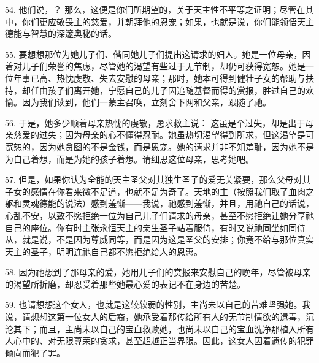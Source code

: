 \par

54. 他们说，？  那么，这便是你们所期望的，关于天主性不平等之证明；尽管在其中，你们更应敬畏主的慈爱，并朝拜他的恩宠；如果，也就是说，你们能领悟天主德能与智慧的深邃奥秘的话。\par

55. 要想想那位为她儿子们、偕同她儿子们提出这请求的妇人。她是一位母亲，因着对儿子们荣誉的焦虑，尽管她的渴望有些过于无节制，却仍可获得宽恕。她是一位年事已高、热忱虔敬、失去安慰的母亲；那时，她本可得到健壮子女的帮助与扶持，却任由孩子们离开她，宁愿自己的儿子因追随基督而得的赏报，胜过自己的欢愉。因为我们读到，他们一蒙主召唤，立刻舍下网和父亲，跟随了祂。\par

56. 于是，她多少顺着母亲热忱的虔敬，恳求救主说： 这虽是个过失，却是出于母亲慈爱的过失；因为母亲的心不懂得忍耐。她虽热切渴望得到所求，但这渴望是可宽恕的，因为她贪图的不是金钱，而是恩宠。她的请求并非不知羞耻，因为她不是为自己着想，而是为她的孩子着想。请细思这位母亲，思考她吧。\par

57. 但是，如果你认为全能的天主圣父对其独生圣子的爱无关紧要，那么父母对其子女的感情在你看来微不足道，也就不足为奇了。天地的主（按照我们取了血肉之躯和灵魂德能的说法）感到羞惭——我说，祂感到羞惭，并且，用祂自己的话说，心乱不安，以致不愿拒绝一位为自己儿子们请求的母亲，甚至不愿拒绝让她分享祂自己的座位。你有时主张永恒天主的亲生圣子站着服侍，有时又说祂同坐如同侍从，就是说，不是因为尊威同等，而是因为这是圣父的安排；你竟不给与那位真实天主的圣子，明明连祂自己都不愿拒绝给人的恩惠。\par

58. 因为祂想到了那母亲的爱，她用儿子们的赏报来安慰自己的晚年，尽管被母亲的渴望所折磨，却忍受着那些她最心爱的表记不在身边的苦楚。\par

59. 也请想想这个女人，也就是这较软弱的性别，主尚未以自己的苦难坚强她。我说，请想想这第一位女人的后裔，她承受着那传给所有人的无节制情欲的遗毒，沉沦其下；而且，主尚未以自己的宝血救赎她，也尚未以自己的宝血洗净那植入所有人心中的、对无限尊荣的贪求，甚至超越正当界限。因此，这女人因着遗传的犯罪倾向而犯了罪。\par

